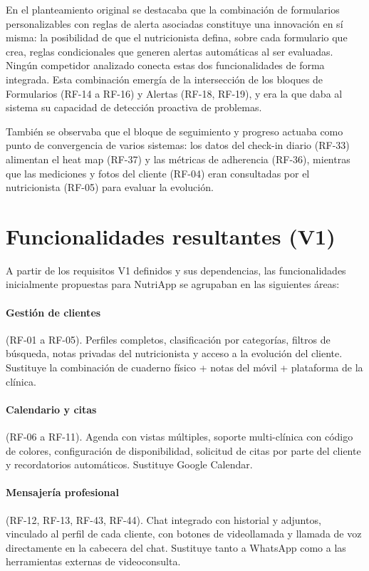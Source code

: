 En el planteamiento original se destacaba que la combinación de formularios personalizables con reglas de alerta asociadas constituye una innovación en sí misma: la posibilidad de que el nutricionista defina, sobre cada formulario que crea, reglas condicionales que generen alertas automáticas al ser evaluadas. Ningún competidor analizado conecta estas dos funcionalidades de forma integrada. Esta combinación emergía de la intersección de los bloques de Formularios (RF-14 a RF-16) y Alertas (RF-18, RF-19), y era la que daba al sistema su capacidad de detección proactiva de problemas.

También se observaba que el bloque de seguimiento y progreso actuaba como punto de convergencia de varios sistemas: los datos del check-in diario (RF-33) alimentan el heat map (RF-37) y las métricas de adherencia (RF-36), mientras que las mediciones y fotos del cliente (RF-04) eran consultadas por el nutricionista (RF-05) para evaluar la evolución.


\section{Funcionalidades resultantes (V1)}
\label{sec:funcionalidades-v1}

A partir de los requisitos V1 definidos y sus dependencias, las funcionalidades inicialmente propuestas para NutriApp se agrupaban en las siguientes áreas:

\paragraph{Gestión de clientes} (RF-01 a RF-05). Perfiles completos, clasificación por categorías, filtros de búsqueda, notas privadas del nutricionista y acceso a la evolución del cliente. Sustituye la combinación de cuaderno físico + notas del móvil + plataforma de la clínica.

\paragraph{Calendario y citas} (RF-06 a RF-11). Agenda con vistas múltiples, soporte multi-clínica con código de colores, configuración de disponibilidad, solicitud de citas por parte del cliente y recordatorios automáticos. Sustituye Google Calendar.

\paragraph{Mensajería profesional} (RF-12, RF-13, RF-43, RF-44). Chat integrado con historial y adjuntos, vinculado al perfil de cada cliente, con botones de videollamada y llamada de voz directamente en la cabecera del chat. Sustituye tanto a WhatsApp como a las herramientas externas de videoconsulta.

